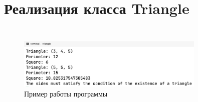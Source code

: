 \documentclass[a4paper,14pt]{extarticle}
\numberwithin{figure}{section}
\begin{document}
\inputminted{csharp}{../MyClass/MyClass/Book1.cs}

\inputminted{csharp}{../MyClass/MyClass/Program1.cs}

\section{Реализация класса Triangle}

\inputminted{csharp}{../Triangle/Triangle/Triangle.cs}

\inputminted{csharp}{../Triangle/Triangle/Program.cs}

\begin{figure}[H]
    \centering
    \includegraphics[width=0.8\textwidth]{task-3.png}
    \caption{Пример работы программы}
\end{figure}
\end{document}
